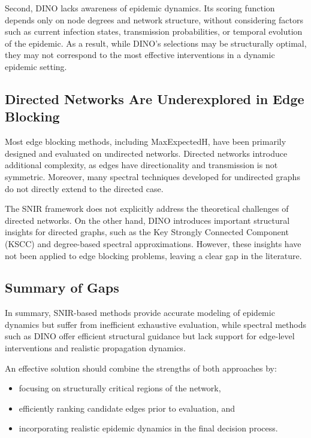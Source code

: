 \documentclass[conference]{IEEEtran}
\begin{document}
Second, DINO lacks awareness of epidemic dynamics. Its scoring function depends only on node degrees and network structure, without considering factors such as current infection states, transmission probabilities, or temporal evolution of the epidemic. As a result, while DINO's selections may be structurally optimal, they may not correspond to the most effective interventions in a dynamic epidemic setting.

\subsection{Directed Networks Are Underexplored in Edge Blocking}

Most edge blocking methods, including MaxExpectedH, have been primarily designed and evaluated on undirected networks. Directed networks introduce additional complexity, as edges have directionality and transmission is not symmetric. Moreover, many spectral techniques developed for undirected graphs do not directly extend to the directed case.

The SNIR framework does not explicitly address the theoretical challenges of directed networks. On the other hand, DINO introduces important structural insights for directed graphs, such as the Key Strongly Connected Component (KSCC) and degree-based spectral approximations. However, these insights have not been applied to edge blocking problems, leaving a clear gap in the literature.

\subsection{Summary of Gaps}

In summary, SNIR-based methods provide accurate modeling of epidemic dynamics but suffer from inefficient exhaustive evaluation, while spectral methods such as DINO offer efficient structural guidance but lack support for edge-level interventions and realistic propagation dynamics.

An effective solution should combine the strengths of both approaches by:
\begin{itemize}
    \item focusing on structurally critical regions of the network,
    \item efficiently ranking candidate edges prior to evaluation, and
    \item incorporating realistic epidemic dynamics in the final decision process.
\end{itemize}
\end{document}
